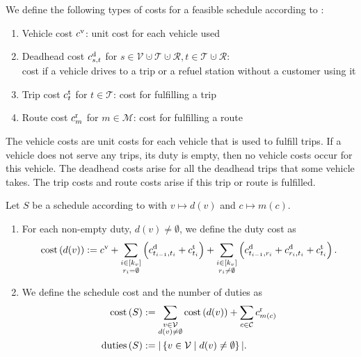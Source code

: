 We define the following types of costs for a feasible schedule according to :
\begin{enumerate}
	\item{Vehicle cost $c^{\operatorname{v}}$: unit cost for each vehicle used}
	\item{Deadhead cost $c^{\operatorname{d}}_{s,t}$ for $s\in\mathcal{V}\cupdot\mathcal{T}\cupdot\mathcal{R}, t\in\mathcal{T}\cupdot\mathcal{R}$:\\
	cost if a vehicle drives to a trip or a refuel station without a customer using it}
	\item{Trip cost $c^{\operatorname{t}}_t$ for $t\in\mathcal{T}$: cost for fulfilling a trip}
	\item{Route cost $c^{\operatorname{r}}_m$ for $m\in\mathcal{M}$: cost for fulfilling a route}
\end{enumerate}

The vehicle costs are unit costs for each vehicle that is used to fulfill trips. If a vehicle does not serve any trips, \ie its duty is empty, then no vehicle costs occur for this vehicle. The deadhead costs arise for all the deadhead trips that some vehicle takes. The trip costs and route costs arise if this trip or route is fulfilled.

\begin{definition}
\label{def:schedule_cost}

Let $S$ be a schedule according to  with ${v\mapsto d(v)}$ and ${c\mapsto m(c)}$.
\begin{enumerate}
	\item
For each non-empty duty, \ie $d(v)\neq\emptyset$, we define the duty cost as
\begin{align*}
	\operatorname{cost}\left(d(v)\right) := c^{\operatorname{v}} + \sum_{\substack{i\in[k_v] \\ r_i=\emptyset}} \left(c^{\operatorname{d}}_{t_{i-1},t_i} + c^{\operatorname{t}}_{t_i}\right) + \sum_{\substack{i\in[k_v] \\ r_i\neq\emptyset}} \left(c^{\operatorname{d}}_{t_{i-1},r_i} + c^{\operatorname{d}}_{r_i,t_i} + c^{\operatorname{t}}_{t_i}\right).
\end{align*}

	\item
We define the schedule cost and the number of duties as
\begin{align*}
	\operatorname{cost}\left(S\right) & := \sum_{\substack{v\in\mathcal{V} \\ d(v)\neq\emptyset}} \operatorname{cost}\left(d(v)\right) + \sum_{c\in\mathcal{C}} c^{\operatorname{r}}_{m(c)} \\
	\operatorname{duties}\left(S\right) & := |\left\{v\in\mathcal{V}\mid d(v)\neq\emptyset\right\}|.
\end{align*}
\end{enumerate}

\end{definition}

